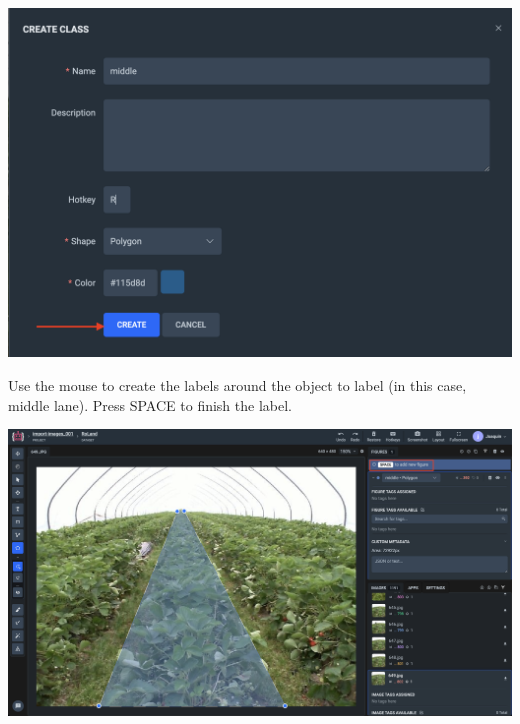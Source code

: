 \documentclass[12pt]{article}
\begin{document}
\begin{center}
\includegraphics[width=1.0\textwidth]{Bilder/upload_7}
\end{center}

Use the mouse to create the labels around the object to label (in this case, middle lane). Press SPACE to finish the label.
\begin{center}
\includegraphics[width=1.0\textwidth]{Bilder/upload_8}
\end{center}
\newpage
\end{document}
